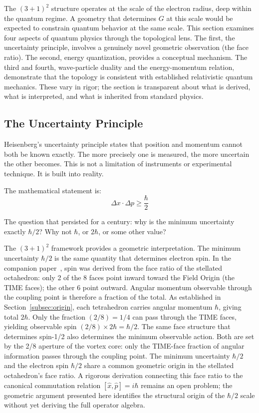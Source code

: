 \documentclass[aps,prd,preprint,superscriptaddress,showpacs,preprintnumbers,amsmath,amssymb,nofootinbib]{revtex4-2}
\begin{document}
The $(3+1)^2$ structure operates at the scale of the electron radius, deep within the quantum regime. A geometry that determines $G$ at this scale would be expected to constrain quantum behavior at the same scale. This section examines four aspects of quantum physics through the topological lens. The first, the uncertainty principle, involves a genuinely novel geometric observation (the face ratio). The second, energy quantization, provides a conceptual mechanism. The third and fourth, wave-particle duality and the energy-momentum relation, demonstrate that the topology is consistent with established relativistic quantum mechanics. These vary in rigor; the section is transparent about what is derived, what is interpreted, and what is inherited from standard physics.

\subsection{The Uncertainty Principle}
\label{subsec:uncertainty}

Heisenberg's uncertainty principle states that position and momentum cannot both be known exactly. The more precisely one is measured, the more uncertain the other becomes. This is not a limitation of instruments or experimental technique. It is built into reality.

The mathematical statement is:
\begin{equation}
\Delta x \cdot \Delta p \geq \frac{\hbar}{2}
\end{equation}

The question that persisted for a century: why is the minimum uncertainty exactly $\hbar/2$? Why not $\hbar$, or $2\hbar$, or some other value?

The $(3+1)^2$ framework provides a geometric interpretation. The minimum uncertainty $\hbar/2$ is the same quantity that determines electron spin. In the companion paper~\cite{paper6}, spin was derived from the face ratio of the stellated octahedron: only 2 of the 8 faces point inward toward the Field Origin (the TIME faces); the other 6 point outward. Angular momentum observable through the coupling point is therefore a fraction of the total. As established in Section~\ref{subsec:origin}, each tetrahedron carries angular momentum $\hbar$, giving total $2\hbar$. Only the fraction $(2/8) = 1/4$ can pass through the TIME faces, yielding observable spin $(2/8) \times 2\hbar = \hbar/2$. The same face structure that determines spin-1/2 also determines the minimum observable action. Both are set by the 2/8 aperture of the vortex core: only the TIME-face fraction of angular information passes through the coupling point. The minimum uncertainty $\hbar/2$ and the electron spin $\hbar/2$ share a common geometric origin in the stellated octahedron's face ratio. A rigorous derivation connecting this face ratio to the canonical commutation relation $[\hat{x}, \hat{p}] = i\hbar$ remains an open problem; the geometric argument presented here identifies the structural origin of the $\hbar/2$ scale without yet deriving the full operator algebra.
\end{document}
